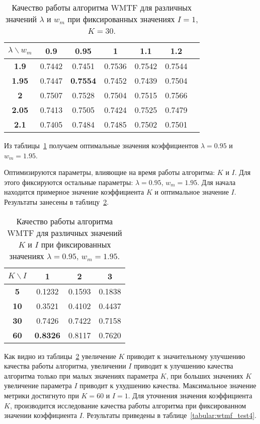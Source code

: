     \begin{table}[ht!]
        \caption{Качество работы алгоритма WMTF для различных значений $\lambda$ и $w_m$ при фиксированных значениях $I=1$, $K=30$. \bigskip}
        \centering

        \label{tabular:wtmf_test2}
        \begin{tabular}{|c|c|c|c|c|c|c|} \hline
            $\lambda \backslash w_m$ & \bf{0.9} & \bf{0.95} & \bf{1} & \bf{1.1} & \bf{1.2} \\ \hline
            \bf{1.9} & 0.7442 & 0.7451 & 0.7536 & 0.7542 & 0.7544 \\ \hline
            \bf{1.95} & 0.7447 & \bf{0.7554} & 0.7452 & 0.7439 & 0.7504 \\ \hline
            \bf{2} & 0.7507 & 0.7528 & 0.7504 & 0.7515 & 0.7566 \\ \hline
            \bf{2.05} & 0.7413 & 0.7505 & 0.7424 & 0.7525 & 0.7479 \\ \hline
            \bf{2.1} & 0.7405 & 0.7484 & 0.7485 & 0.7502 & 0.7501 \\ \hline
        \end{tabular}
    \end{table}
    Из таблицы~\ref{tabular:wtmf_test2} получаем оптимальные значения коэффициентов $\lambda=0.95$ и $w_m=1.95$.

    Оптимизируются параметры, влияющие на время работы алгоритма: $K$ и $I$.
    Для этого фиксируются остальные параметры: $\lambda=0.95$, $w_m=1.95$.
    Для начала находится примерное значение коэффициента $K$ и оптимальное значение $I$.
    Результаты занесены в таблицу~\ref{tabular:wtmf_test3}.

    \begin{table}[ht!]
        \caption{Качество работы алгоритма WMTF для различных значений $K$ и $I$ при фиксированных значениях $\lambda=0.95$, $w_m=1.95$. \bigskip}
        \centering

        \label{tabular:wtmf_test3}
        \begin{tabular}{|c|c|c|c|} \hline
            $K \backslash I$ & \bf{1} & \bf{2} & \bf{3} \\ \hline
            \bf{5} & 0.1232 & 0.1593 & 0.1838 \\ \hline
            \bf{10} & 0.3521 & 0.4102 & 0.4437 \\ \hline
            \bf{30} & 0.7426 & 0.7422 & 0.7158 \\ \hline
            \bf{60} & \bf{0.8326} & 0.8117 & 0.7620 \\ \hline
        \end{tabular}
    \end{table}
    Как видно из таблицы~\ref{tabular:wtmf_test3} увеличение $K$ приводит к значительному улучшению качества работы алгоритма,
    увеличении $I$ приводит к улучшению качества алгоритма только при малых значениях параметра $K$, при больших значениях $K$ увеличение параметра $I$ приводит к ухудшению качества.
    Максимальное значение метрики достигнуто при $K=60$ и $I=1$.
    Для уточнения значения коэффициента $K$, производится исследование качества работы алгоритма при фиксированном значении коэффициента $I$.
    Результаты приведены в таблице~\ref{tabular:wtmf_test4}.

